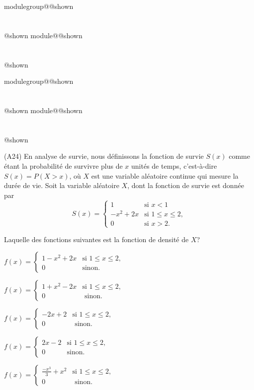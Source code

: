 \documentclass{Evaluation}
\makeatletter
\newcommand{\currentmodulekey}{}
\newcommand{\currentmoduletitle}{}
\newcommand{\currentgroupkey}{}
\newcommand{\currentgrouptitle}{}
\newcommand{\showmoduleifneeded}{%
  \ifx\currentgroupkey\empty\else
    \expandafter\ifx\csname modulegroup@\currentgroupkey @shown\endcsname\relax
      \section*{\currentgrouptitle}%
      \expandafter\gdef\csname modulegroup@\currentgroupkey @shown\endcsname{1}%
    \fi
  \fi
  \expandafter\ifx\csname module@\currentmodulekey @shown\endcsname\relax
    \section*{\currentmoduletitle}%
    \expandafter\gdef\csname module@\currentmodulekey @shown\endcsname{1}%
  \fi
}
\newenvironment{H24}{\showmoduleifneeded}{}
\newenvironment{A24}{\showmoduleifneeded}{}
\makeatother
\begin{document}
\begin{questions}
\begin{H24}
\begin{parts}
\end{parts}
\end{H24}

\begin{A24}
\question (A24) En analyse de survie, nous définissons la fonction de survie $S(x)$ comme étant la probabilité de survivre plus de $x$ unités de temps, c'est-à-dire $S(x)=P(X>x)$, où $X$ est une variable aléatoire continue qui mesure la durée de vie.  Soit la variable aléatoire $X$, dont la fonction de survie est donnée par 
\[ S(x) =
\begin{cases}
1 & \text{si } x<1\\
   \displaystyle -x^2+2x& \text{si } 1\leq x\leq 2, \\
    0 & \text{si } x>2.
\end{cases}
\]

Laquelle des fonctions suivantes est la fonction de densité de $X$?

\begin{checkboxes}
\choice $f(x)=\left\{
			\begin{array}{ll}
   \displaystyle 1-x^2+2x& \text{si } 1\leq x\leq 2, \\
			0 & \mbox{sinon.}
			\end{array}
			\right. $
		
\correctchoice $ f(x) = \left\{
			\begin{array}{ll}
   \displaystyle 1+x^2-2x& \text{si } 1\leq x\leq 2, \\
			0 & \mbox{ sinon.}
			\end{array}
			\right. $
   		
\choice $ f(x) = \left\{
			\begin{array}{ll}
   \displaystyle -2x+2& \text{si } 1\leq x\leq 2, \\
			0 & \mbox{ sinon.}
			\end{array}
			\right. $
   		
\choice $ f(x) = \left\{
			\begin{array}{ll}
   \displaystyle 2x-2& \text{si } 1\leq x\leq 2, \\
			0 & \mbox{sinon.}
			\end{array}
			\right. $
   		

\choice $ f(x) = \left\{
			\begin{array}{ll}
   \displaystyle \frac{-x^3}{3}+x^2& \text{si } 1\leq x\leq 2, \\

			0 &  \mbox{ sinon. }
			\end{array}
			\right. $


\end{checkboxes}
\end{A24}
\end{questions}
\end{document}
